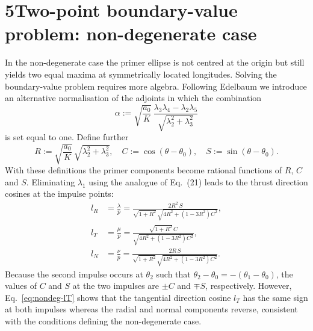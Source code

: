 \documentclass[12pt]{article}
\begin{document}
\section*{5\quad Two-point boundary-value problem: non-degenerate case}
\label{sec:nondegenerate-bvp}

In the non-degenerate case the primer ellipse is not centred at the
origin but still yields two equal maxima at symmetrically located
longitudes.  Solving the boundary-value problem requires more
algebra.  Following Edelbaum we introduce an alternative normalisation
of the adjoints in which the combination
\[
  \alpha := \sqrt{\frac{a_0}{K}}\,\frac{\lambda_3\lambda_4 - \lambda_2\lambda_5}{\sqrt{\lambda_2^2 + \lambda_3^2}}
\]
is set equal to one.  Define further
\[
  R := \sqrt{\frac{a_0}{K}}\,\sqrt{\lambda_2^2 + \lambda_3^2},\quad
  C := \cos(\theta - \theta_0),\quad S := \sin(\theta - \theta_0).
\]
With these definitions the primer components become rational
functions of $R$, $C$ and $S$.  Eliminating $\lambda_1$ using the
analogue of Eq.~(21) leads to the thrust direction cosines at the
impulse points:
\begin{align}
  l_R &= \frac{\lambda}{p}
        = \frac{2R^2\,S}{\sqrt{1+R^2}\,\sqrt{4R^2 + (1-3R^2)C^2}},
        \tag{B1}\label{eq:nondeg-lR}\\
  l_T &= \frac{\mu}{p}
        = \frac{\sqrt{1+R^2}\,C}{\sqrt{4R^2 + (1-3R^2)C^2}},
        \tag{B2}\label{eq:nondeg-lT}\\
  l_N &= \frac{\nu}{p}
        = \frac{2R\,S}{\sqrt{1+R^2}\,\sqrt{4R^2 + (1-3R^2)C^2}}.
        \tag{B3}\label{eq:nondeg-lN}
\end{align}
Because the second impulse occurs at $\theta_2$ such that $\theta_2
-\theta_0 = -(\theta_1-\theta_0)$, the values of $C$ and $S$ at the
two impulses are $\pm C$ and $\mp S$, respectively.  However,
Eq.~\eqref{eq:nondeg-lT} shows that the tangential direction cosine
$l_T$ has the same sign at both impulses whereas the radial and normal
components reverse, consistent with the conditions defining the
non-degenerate case.
\end{document}
